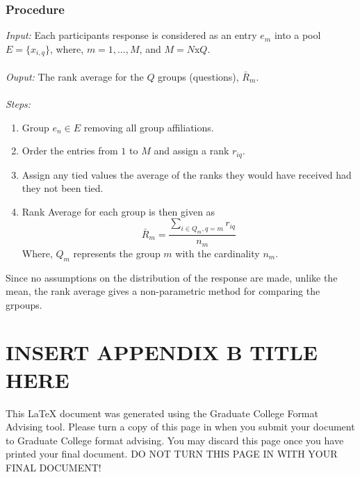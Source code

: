 \documentclass[oneside,11pt]{memoir}
\begin{document}
\subsection{Procedure}

\begingroup
\setlength{\parindent}{0in}
\emph{Input:} Each participants response is considered as an entry $e_m$ into a pool $E = \{x_{i,q}\}$, where, $m=1,\ldots,M$, and $M=N$x$Q$. \\ \\
\emph{Ouput:} The rank average for the $Q$ groups (questions), $\bar{R}_m$.\\ \\
\emph{Steps:}
\begin{enumerate}[1.]
\item Group $e_n \in E$ removing all group affiliations.
\item Order the entries from $1$ to $M$ and assign a rank $r_{iq}$.
\item Assign any tied values the average of the ranks they would have received had they not been tied.
\item Rank Average for each group is then given as
\begin{equation}
\bar{R}_m = \frac{\displaystyle\sum\limits_{i \in Q_m, q=m}r_{iq}}{n_m}
\end{equation}
Where, $Q_m$ represents the group $m$ with the cardinality $n_m$. 
\end{enumerate}
\endgroup

Since no assumptions on the distribution of the response are made, unlike the mean, the rank average gives a non-parametric method for comparing the grpoups.

\chapter{\uppercase{Insert Appendix B Title here}}
\clearpage


This LaTeX document was generated using the Graduate College Format Advising tool. Please turn a copy of this page in when you submit your document to Graduate College format advising. You may discard this page once you have printed your final document. DO NOT TURN THIS PAGE IN WITH YOUR FINAL DOCUMENT!
\end{document}
